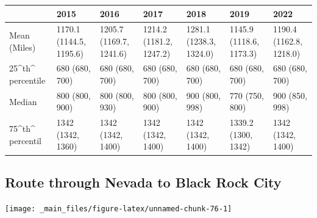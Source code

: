 \documentclass[
]{book}
\begin{document}
\begin{table}
\centering
\begin{tabular}[t]{>{}l|>{}l|l|l|l|l|l}
\hline
  & 2015 & 2016 & 2017 & 2018 & 2019 & 2022\\
\hline
Mean (Miles) & 1170.1 (1144.5, 1195.6) & 1205.7 (1169.7, 1241.6) & 1214.2 (1181.2, 1247.2) & 1281.1 (1238.3, 1324.0) & 1145.9 (1118.6, 1173.3) & 1190.4 (1162.8, 1218.0)\\
\hline
25\textasciicircum{}th\textasciicircum{} percentile & 680 (680, 700) & 680 (680, 700) & 680 (680, 700) & 680 (680, 700) & 680 (680, 700) & 680 (680, 700)\\
\hline
Median & 800 (800, 900) & 800 (800, 930) & 800 (800, 900) & 900 (800, 998) & 770 (750, 800) & 900 (850, 998)\\
\hline
75\textasciicircum{}th\textasciicircum{} percentil & 1342 (1342, 1360) & 1342 (1342, 1400) & 1342 (1342, 1400) & 1342 (1342, 1400) & 1339.2 (1300, 1342) & 1342 (1342, 1400)\\
\hline
\end{tabular}
\end{table}

\hypertarget{route-through-nevada-to-black-rock-city}{%
\subsection{Route through Nevada to Black Rock City}\label{route-through-nevada-to-black-rock-city}}

\texttt{[image: \_main\_files/figure-latex/unnamed-chunk-76-1]}
\end{document}
